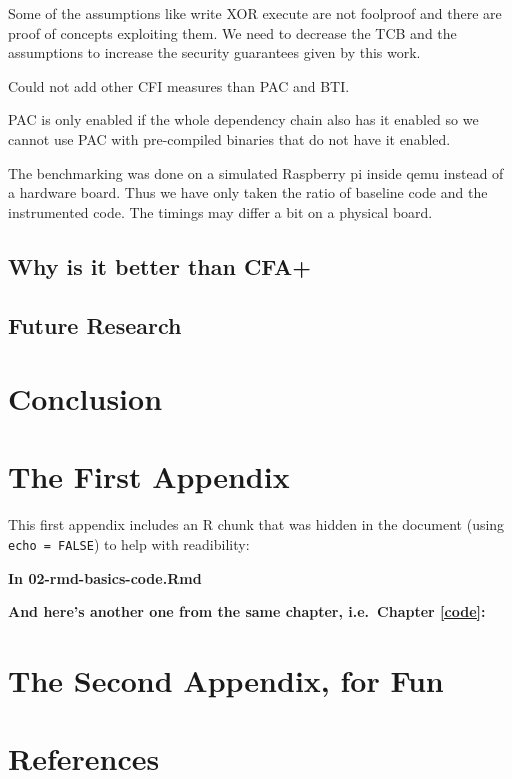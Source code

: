 \documentclass[a4paper, nobind]{templates/ociamthesis}
\begin{document}
Some of the assumptions like write XOR execute are not foolproof and there are
proof of concepts exploiting them. We need to decrease the TCB and the
assumptions to increase the security guarantees given by this work.

Could not add other CFI measures than PAC and BTI.

PAC is only enabled if the whole dependency chain also has it enabled so we
cannot use PAC with pre-compiled binaries that do not have it enabled.

The benchmarking was done on a simulated Raspberry pi inside qemu instead of a
hardware board. Thus we have only taken the ratio of baseline code and the
instrumented code. The timings may differ a bit on a physical board.

\section{Why is it better than CFA+}\label{why-is-it-better-than-cfa}

\section{Future Research}\label{future-research}

\chapter*{Conclusion}\label{conclusion}

\startappendices

\chapter{The First Appendix}\label{the-first-appendix}

This first appendix includes an R chunk that was hidden in the document (using \texttt{echo\ =\ FALSE}) to help with readibility:

\textbf{In 02-rmd-basics-code.Rmd}

\textbf{And here's another one from the same chapter, i.e.~Chapter \ref{code}:}

\chapter{The Second Appendix, for Fun}\label{the-second-appendix-for-fun}

\chapter*{References}\label{references}
\end{document}
